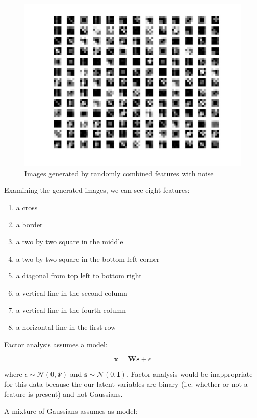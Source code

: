 \documentclass[12pt]{article}
\begin{document}
\begin{figure}[h]
\centering
\includegraphics[scale=0.4]{data/images}
\caption{Images generated by randomly combined features with noise}
\label{fig:3d-images}
\end{figure}

Examining the generated images, we can see eight features:
\begin{enumerate}[\hspace{2cm}(1)]
\item a cross
\item a border
\item a two by two square in the middle
\item a two by two square in the bottom left corner
\item a diagonal from top left to bottom right
\item a vertical line in the second column
\item a vertical line in the fourth column
\item a horizontal line in the first row
\end{enumerate}

Factor analysis assumes a model:

\[\textbf{x} = \textbf{W}\textbf{s} + \epsilon\]

where $\epsilon \sim \mathcal{N}(0, \Psi)$ and $\textbf{s} \sim \mathcal{N}(0, \textbf{I})$. Factor analysis would be inappropriate for this data because the our latent variables are binary (i.e. whether or not a feature is present) and not Gaussians.

A mixture of Gaussians assumes as model:
\end{document}
